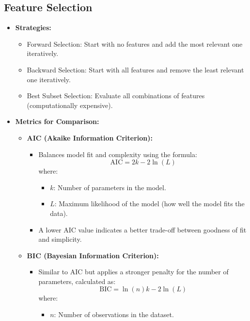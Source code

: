 \documentclass[11pt]{article}
\begin{document}
\subsection{Feature Selection}
\begin{itemize}
    \item \textbf{Strategies:}
    \begin{itemize}
        \item Forward Selection: Start with no features and add the most relevant one iteratively.
        \item Backward Selection: Start with all features and remove the least relevant one iteratively.
        \item Best Subset Selection: Evaluate all combinations of features (computationally expensive).
    \end{itemize}
    \item \textbf{Metrics for Comparison:}
    \begin{itemize}
        \item \textbf{AIC (Akaike Information Criterion):}
        \begin{itemize}
            \item Balances model fit and complexity using the formula:
                  \[
                  \text{AIC} = 2k - 2\ln(L)
                  \]
                  where:
                  \begin{itemize}
                      \item \(k\): Number of parameters in the model.
                      \item \(L\): Maximum likelihood of the model (how well the model fits the data).
                  \end{itemize}
            \item A lower AIC value indicates a better trade-off between goodness of fit and simplicity.
        \end{itemize}
        \item \textbf{BIC (Bayesian Information Criterion):}
        \begin{itemize}
            \item Similar to AIC but applies a stronger penalty for the number of parameters, calculated as:
                  \[
                  \text{BIC} = \ln(n)k - 2\ln(L)
                  \]
                  where:
                  \begin{itemize}
                      \item \(n\): Number of observations in the dataset.

\end{itemize}
\end{itemize}
\end{itemize}
\end{itemize}
\end{document}

